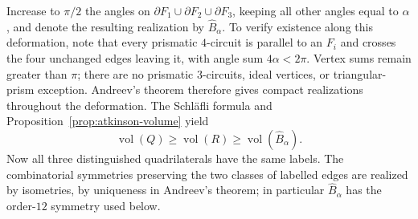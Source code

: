 \documentclass[12pt,a4paper]{article}
\theoremstyle{definition}
\DeclareMathOperator{\Vol}{vol}
\begin{document}
Increase to \(\pi/2\) the angles on
\(\partial F_1\cup\partial F_2\cup\partial F_3\), keeping all other
angles equal to \(\alpha\), and denote the resulting realization by
\(\widehat B_\alpha\). To verify existence along this deformation, note
that every prismatic \(4\)-circuit is parallel to an \(F_i\) and crosses
the four unchanged edges leaving it, with angle sum \(4\alpha<2\pi\).
Vertex sums remain greater than \(\pi\); there are no prismatic
\(3\)-circuits, ideal vertices, or triangular-prism exception. Andreev's
theorem therefore gives compact realizations throughout the deformation.
The Schl\"afli formula and Proposition~\ref{prop:atkinson-volume} yield
\begin{equation}\label{eq:component-to-Bhat}
        \Vol(Q)\ge \Vol(R)\ge \Vol(\widehat B_\alpha).
\end{equation}
Now all three distinguished quadrilaterals have the same labels.  The
combinatorial symmetries preserving the two classes of labelled edges are
realized by isometries, by uniqueness in Andreev's theorem; in particular
\(\widehat B_\alpha\) has the order-\(12\) symmetry used below.
\end{document}
